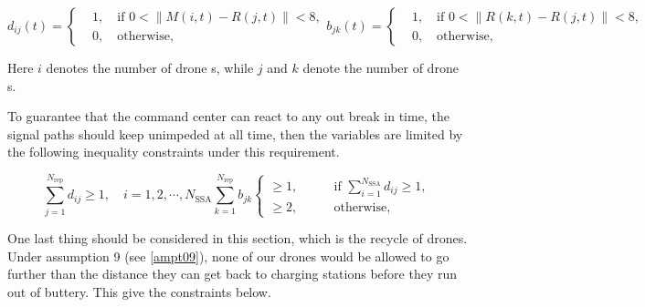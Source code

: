 \documentclass[13pt]{ctexart} %
\begin{document}
\begin{subequations}
    \begin{equation}
        d_{ij}(t)=\left\{
            \begin{aligned}
                &1, \quad \text{if } 0< \lVert M(i,t)-R(j,t)\rVert< 8,\\
                &0,\quad \text{otherwise},
            \end{aligned}
        \right.
    \end{equation}
    \begin{equation}
        b_{jk}(t)=\left\{
            \begin{aligned}
                &1, \quad \text{if } 0< \lVert R(k,t)-R(j,t)\rVert< 8,\\
                &0,\quad \text{otherwise},
            \end{aligned}
        \right.
    \end{equation}
\end{subequations}

 Here $i$ denotes the number of drone \uppercase\expandafter{}s, while $j$ and $k$ denote the number of drone \uppercase\expandafter{}s.

To guarantee that the command center can react to any out break in time, the signal paths should keep unimpeded at all time, then the variables are limited by the following inequality constraints under this requirement.

\begin{subequations}
    \begin{equation}
        \sum_{j=1}^{N_{\text{rep}}}d_{ij}\geq 1, \quad i=1,2,\cdots,N_{\text{SSA}}
    \end{equation}
    \begin{equation}
        \sum_{k=1}^{N_{\text{rep}}}b_{jk}\left\{
        \begin{aligned}
            \geq 1,& \qquad \text{if }\sum_{i=1}^{N_{\text{SSA}}} d_{ij}\geq 1,\\
            \geq 2,& \qquad \text{otherwise},
        \end{aligned}
        \right.
    \end{equation}
\end{subequations}

One last thing should be considered in this section, which is the recycle of drones. Under assumption 9 (see \ref{ampt09}), none of our drones would be allowed to go further than the distance they can get back to charging stations before they run out of buttery. This give the constraints below.
\end{document}
